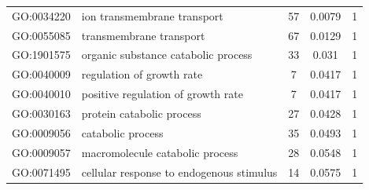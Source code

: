 \documentclass[10pt,letterpaper]{article}
\begin{document}
{\begin{table}[]
\begin{adjustwidth}{-2.25in}{}
\begin{tabular}{llccc}
GO:0034220          & ion transmembrane transport                                                                & 57                                                     & 0.0079                                                & 1                                                  \\
GO:0055085          & transmembrane transport                                                                    & 67                                                     & 0.0129                                                & 1                                                  \\
GO:1901575          & organic substance catabolic process                                                        & 33                                                     & 0.031                                                 & 1                                                  \\
GO:0040009          & regulation of growth rate                                                                  & 7                                                      & 0.0417                                                & 1                                                  \\
GO:0040010          & positive regulation of growth rate                                                         & 7                                                      & 0.0417                                                & 1                                                  \\
GO:0030163          & protein catabolic process                                                                  & 27                                                     & 0.0428                                                & 1                                                  \\
GO:0009056          & catabolic process                                                                          & 35                                                     & 0.0493                                                & 1                                                  \\
GO:0009057          & macromolecule catabolic process                                                            & 28                                                     & 0.0548                                                & 1                                                  \\
GO:0071495          & cellular response to endogenous stimulus                                                   & 14                                                     & 0.0575                                                & 1                                                  \\

\end{tabular}
\end{adjustwidth}
\end{table}}
\end{document}
